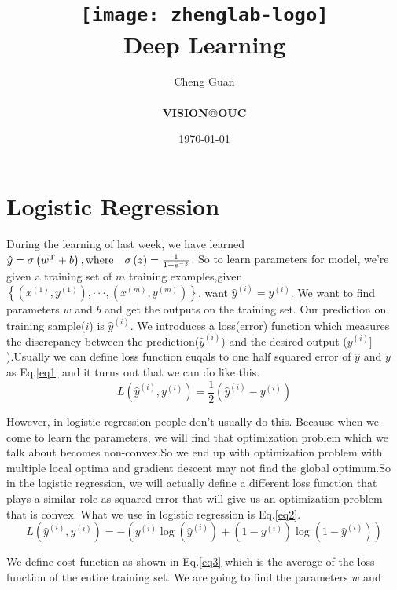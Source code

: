 \documentclass[a4paper]{article}
\title{
    \vspace*{1in}
    \texttt{[image: zhenglab-logo]} \\
    \vspace*{1.2in}
    \textbf{\huge Deep Learning}
    \vspace{0.2in}
}
\author{Cheng Guan \\
    \vspace*{0.5in} \\
    \textbf{VISION@OUC}\\
    \vspace*{1in}
}
\date{\today}
\begin{document}
\maketitle
\setcounter{page}{0}
\thispagestyle{empty}
\newpage
\section{Logistic Regression}
During the learning of last week, we have learned 
$\hat{y}=\sigma \left(w^\mathrm{T}+b\right),{\rm where} \quad \sigma\left(z\right) =
\frac{1}{1+e^{-z}}$. So to learn parameters for model, we're given a
training set of $m$ training examples,given $\left\lbrace \left(x^{\left(1\right)},y^{\left(1\right)}\right),\cdot\cdot\cdot,\left(x^{\left(m\right)}, y^{\left(m\right)}\right) \right\rbrace$, want $\hat{y}^{\left(i\right)}=y^{\left(i\right)}$. We want to find parameters
$w$ and $b$ and get the outputs on the training set. Our prediction on training 
sample($i$) is $\hat{y}^{\left(i\right)}$.
We introduces a loss(error) function which measures the discrepancy between
the prediction($\hat{y}^{\left(i\right)}$) and the desired output ($y^{\left(i\right)}]$).Usually we can define loss function euqals to one half squared error of $\hat{y}$ and $y$ as Eq.\ref{eq1} and it turns out that
we can do like this. 
%
\begin{equation}
L\left(\hat{y}^{\left(i\right)},y^{\left(i\right)}\right) = \frac{1}{2}\left(\hat{y}^{\left(i\right)}-y^{\left(i\right)}\right)
\label{eq1}
\end{equation}
%
\par
However, in logistic regression people don't usually do this. 
Because when we come to learn the parameters, we will find that optimization problem which we talk about becomes non-convex.So we end up with optimization problem with
multiple local optima and gradient descent may not find the global optimum.So in the 
logistic regression, we will actually define a different loss function that plays
a similar role as squared error that will give us an optimization 
problem that is convex. What we use in logistic regression is Eq.\ref{eq2}.
%
\begin{equation}
 L\left(\hat{y}^{\left(i\right)},y^{\left(i\right)}\right) = -\left(y^{\left(i\right)}\log\left(\hat{y}^{\left(i\right)}\right) +
 \left(1-y^{\left(i\right)}\right)\log\left(1-\hat{y}^{\left(i\right)}\right)\right)
\label{eq2}
\end{equation}
%
\par
We define cost function as shown in Eq.\ref{eq3} which is the average of the loss function of the entire training set. We are going to find the parameters $w$ and 
\end{document}
